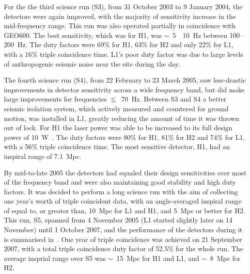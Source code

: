 \documentclass{article}
\newcommand{\Hz}{Hz\super{-1/2}\xspace}
\begin{document}
For the the third science run (S3), from 31 October 2003 to 9 January 2004,
the detectors were again improved, with the majority of sensitivity increase in
the mid-frequency range. This run was also operated partially in coincidence
with GEO600. The best sensitivity, which was for H1, was
$\sim$~5~\texttimes~10~\Hz between 100\,--\,200~Hz. The duty factors
were 69\% for H1, 63\% for H2 and only 22\% for L1, with a 16\% triple
coincidence time. L1's poor duty factor was due to large levels of anthropogenic
seismic noise near the site during the day.

The fourth science run (S4), from 22 February to 23 March 2005, saw less-drastic
improvements in detector sensitivity across a wide frequency band, but did make
large improvements for frequencies $\lesssim$~70~Hz. Between S3 and S4 a better
seismic isolation system, which actively measured and countered for ground
motion, was installed in L1, greatly reducing the amount of time it was thrown
out of lock. For H1 the laser power was able to be increased to its full design
power of 10~W~\cite{Abbott:2007b}. The duty factors were 80\% for H1, 81\% for
H2 and 74\% for L1, with a 56\% triple coincidence time. The most sensitive
detector, H1, had an inspiral range of 7.1~Mpc.

By mid-to-late 2005 the detectors had equaled their design sensitivities over
most of the frequency band and were also maintaining good stability and high
duty factors. It was decided to perform a long science run with the aim of
collecting one year's worth of triple coincident data, with an angle-averaged
inspiral range of equal to, or greater than, 10~Mpc for L1 and H1, and 5~Mpc
or better for H2. This run, S5, spanned from 4 November 2005 (L1 started
slightly later on 14 November) until 1 October 2007, and the performance of the
detectors during it is summarised in~\cite{LIGOS5}. One year of triple
coincidence was achieved on 21 September 2007, with a total triple coincidence
duty factor of 52.5\% for the whole run. The average insprial range over S5
was $\sim$~15~Mpc for H1 and L1, and $\sim$~8~Mpc for H2.
\end{document}
